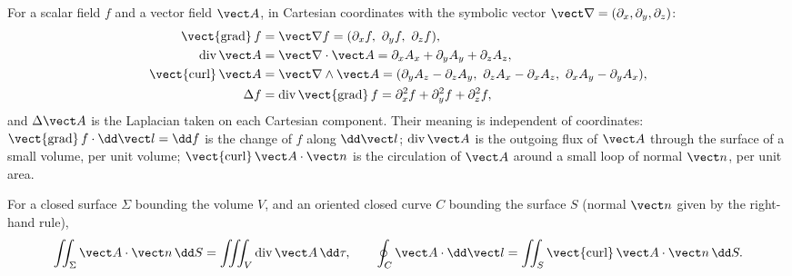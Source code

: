 \begin{definition}\label{def:b2:maxwell-equations:operators}
For a scalar field $f$ and a vector field $\vect A$, in Cartesian
coordinates with the symbolic vector $\vect\nabla = (\partial_x, \partial_y,
\partial_z)$:
\begin{align*}
\operatorname{\vect{grad}}f &= \vect\nabla f = (\partial_xf,\ \partial_yf,\ \partial_zf) ,\\
\operatorname{div}\vect A &= \vect\nabla\cdot\vect A = \partial_xA_x + \partial_yA_y + \partial_zA_z ,\\
\operatorname{\vect{curl}}\vect A &= \vect\nabla\wedge\vect A = (\partial_yA_z - \partial_zA_y,\ \partial_zA_x - \partial_xA_z,\ \partial_xA_y - \partial_yA_x) ,\\
\Delta f &= \operatorname{div}\operatorname{\vect{grad}}f = \partial_x^2f + \partial_y^2f + \partial_z^2f ,
\end{align*}
and $\Delta\vect A$ is the Laplacian taken on each Cartesian component.
Their meaning is independent of coordinates: $\operatorname{\vect{grad}}f
\cdot\dd\vect l = \dd f$ is the change of $f$ along $\dd\vect l$; $\operatorname{div}
\vect A$ is the outgoing flux of $\vect A$ through the surface of a small
volume, per unit volume; $\operatorname{\vect{curl}}\vect A\cdot\vect n$ is the
circulation of $\vect A$ around a small loop of normal $\vect n$, per unit
area.
\end{definition}

\begin{theorem}\label{thm:b2:maxwell-equations:theorems}
For a closed surface $\Sigma$ bounding the volume $V$, and an oriented
closed curve $C$ bounding the surface $S$ (normal $\vect n$ given by the
right-hand rule),
\[
\iint_\Sigma\vect A\cdot\vect n\,\dd S = \iiint_V\operatorname{div}\vect A\,\dd\tau ,
\qquad
\oint_C\vect A\cdot\dd\vect l = \iint_S\operatorname{\vect{curl}}\vect A\cdot\vect n\,\dd S .
\]
\end{theorem}
\admitted

